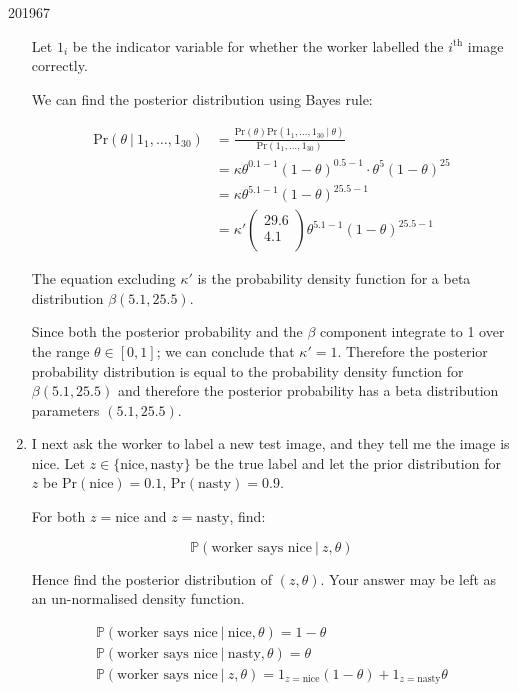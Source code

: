 \documentclass[10pt,\jkfside,a4paper]{article}
\begin{document}
\begin{examquestion}{2019}{6}{7}
\begin{enumerate}[label=(\alph*)]
Let $1_{i}$ be the indicator variable for whether the worker labelled the
$i^\text{th}$ image correctly.

We can find the posterior distribution using Bayes rule:

\[
\begin{split}
\text{Pr}(\theta \ | \ 1_1, \dots, 1_{30})
&= \frac{\text{Pr}(\theta)\text{Pr}(1_1, \dots, 1_{30} \ | \ \theta)}{\text{Pr}(1_1, \dots, 1_{30})} \\
&= \kappa \theta^{0.1 - 1}(1 - \theta)^{0.5 -
1}\cdot\theta^{5}(1 - \theta)^{25} \\
&= \kappa \theta^{5.1 - 1}(1 - \theta)
^{25.5 - 1} \\
&= \kappa' \begin{pmatrix} 29.6 \\ 4.1 \\ \end{pmatrix} \theta^{5.1 - 1}(1 -
\theta)
^{25.5 - 1}
\end{split}
\]

The equation excluding $\kappa'$ is the probability density function for a
beta distribution $\beta\left( 5.1, 25.5 \right)$.

Since both the posterior probability and the $\beta$ component integrate to
1 over the range $\theta \in [0, 1]$; we can conclude that $\kappa' = 1$.
Therefore the posterior probability distribution is
equal to the probability density function for $\beta\left(5.1, 25.5 \right)$
and therefore the posterior probability has a beta distribution
parameters $(5.1, 25.5)$.

\item I next ask the worker to label a new test image, and they tell me the
image is nice. Let $z \in \{\text{nice}, \text{nasty}\}$ be the true
label and let the prior distribution for $z$ be $\text{Pr}(\text{nice})=0.1$,
$\text{Pr}(\text{nasty})=0.9$.

For both $z = \text{nice}$ and $z=\text{nasty}$, find:

\[
\mathbb{P}(\text{worker says nice} \ | \ z, \theta)
\]

Hence find the posterior distribution of $(z, \theta)$. Your answer may be
left as an un-normalised density function.

\begin{gather*}
    \mathbb{P}(\text{worker says nice} \ | \ \text{nice}, \theta) = 1 -
    \theta\\
    \mathbb{P}(\text{worker says nice} \ | \ \text{nasty}, \theta) = \theta\\
    \mathbb{P}(\text{worker says nice} \ | \ z, \theta) =
1_{z=\text{nice}}\left(1 - \theta\right) + 1_{z=\text{nasty}}\theta\\
\end{gather*}


\end{enumerate}
\end{examquestion}
\end{document}

